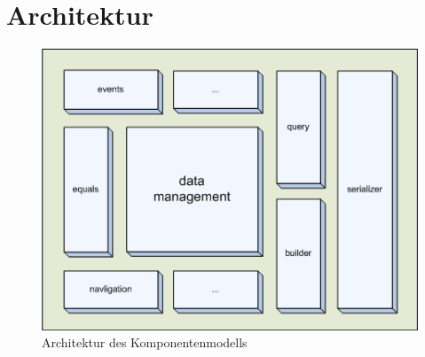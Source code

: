 \section{Architektur}

\begin{figure}[ht]
 \centering \includegraphics[scale=0.8]{arch.png}
 \caption{Architektur des Komponentenmodells}
 \label{fig:arch}
\end{figure}